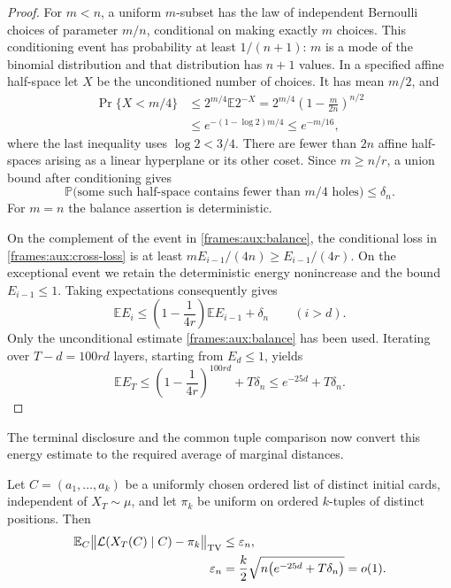 \begin{proof}
For $m<n$, a uniform $m$-subset has the law of independent
Bernoulli choices of parameter $m/n$, conditional on making exactly $m$
choices.  This conditioning event has probability at least $1/(n+1)$:
$m$ is a mode of the binomial distribution and that distribution has
$n+1$ values. In a specified affine half-space let $X$ be the
unconditioned number of choices. It has mean $m/2$, and
\begin{align*}
 \Pr\{X<m/4\}
 &\le 2^{m/4}\mathbb E2^{-X}
 =2^{m/4}\left(1-\frac{m}{2n}\right)^{n/2}\\
 &\le e^{-(1-\log2)m/4}\le e^{-m/16},
\end{align*}
where the last inequality uses $\log2<3/4$. There are
fewer than $2n$ affine half-spaces arising as a linear hyperplane or its
other coset.  Since $m\ge n/r$, a union bound after conditioning gives
\begin{equation}\label{frames:aux:balance}
 \mathbb P\bigl(\text{some such half-space contains fewer than }m/4
                  \text{ holes}\bigr)\le\delta_n.
\end{equation}
For $m=n$ the balance assertion is deterministic.

On the complement of the event in \eqref{frames:aux:balance}, the
conditional loss in \eqref{frames:aux:cross-loss} is at least
$mE_{i-1}/(4n)\ge E_{i-1}/(4r)$.  On the exceptional event we retain
the deterministic energy nonincrease and the bound $E_{i-1}\le1$.
Taking expectations consequently gives
\[
 \mathbb E E_i\le
 \left(1-\frac1{4r}\right)\mathbb E E_{i-1}+\delta_n
 \qquad(i>d).
\]
Only the unconditional estimate \eqref{frames:aux:balance} has been
used.  Iterating over $T-d=100rd$ layers, starting from $E_d\le1$,
yields
\[
 \mathbb E E_T\le
 \left(1-\frac1{4r}\right)^{100rd}+T\delta_n
 \le e^{-25d}+T\delta_n.
\]
\end{proof}

The terminal disclosure and the common tuple comparison now convert
this energy estimate to the required average of marginal distances.

\begin{proposition}\label{frames:aux:marginal}
Let $C=(a_1,\ldots,a_k)$ be a uniformly chosen ordered list of distinct
initial cards, independent of $X_T\sim\mu$, and let $\pi_k$ be uniform
on ordered $k$-tuples of distinct positions. Then
\begin{align}
 \mathbb E_C\bigl\|\mathcal L(X_T(C)\mid C)-\pi_k\bigr\|_{\rm TV}
 &\le\varepsilon_n,\notag\\
 \varepsilon_n
 &=\frac{k}{2}\sqrt{n\bigl(e^{-25d}+T\delta_n\bigr)}=o(1).
 \label{frames:aux:marginal-error}
\end{align}
\end{proposition}

